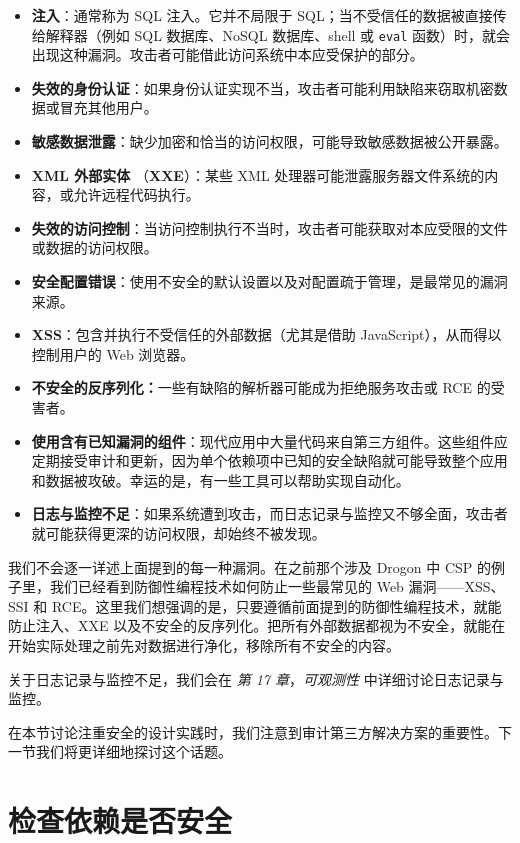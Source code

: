 \begin{itemize}
\label{idx:1045}
\item \textbf{注入}：通常称为 SQL 注入。它并不局限于 SQL；当不受信任的数据被直接传给解释器（例如 SQL 数据库、NoSQL 数据库、shell 或 \texttt{eval} 函数）时，就会出现这种漏洞。攻击者可能借此访问系统中本应受保护的部分。
\item \textbf{失效的身份认证}：如果身份认证实现不当，攻击者可能利用缺陷来窃取机密数据或冒充其他用户。
\item \textbf{敏感数据泄露}：缺少加密和恰当的访问权限，可能导致敏感数据被公开暴露。
\label{idx:1046}
\item \textbf{XML 外部实体 }（\textbf{XXE}）：某些 XML 处理器可能泄露服务器文件系统的内容，或允许远程代码执行。
\item \textbf{失效的访问控制}：当访问控制执行不当时，攻击者可能获取对本应受限的文件或数据的访问权限。
\item \textbf{安全配置错误}：使用不安全的默认设置以及对配置疏于管理，是最常见的漏洞来源。
\item \textbf{XSS}：包含并执行不受信任的外部数据（尤其是借助 JavaScript），从而得以控制用户的 Web 浏览器。
\item \textbf{不安全的反序列化：}一些有缺陷的解析器可能成为拒绝服务攻击或 RCE 的受害者。
\label{idx:1047}
\item \textbf{使用含有已知漏洞的组件}：现代应用中大量代码来自第三方组件。这些组件应定期接受审计和更新，因为单个依赖项中已知的安全缺陷就可能导致整个应用和数据被攻破。幸运的是，有一些工具可以帮助实现自动化。
\item \textbf{日志与监控不足}：如果系统遭到攻击，而日志记录与监控又不够全面，攻击者就可能获得更深的访问权限，却始终不被发现。
\end{itemize}

我们不会逐一详述上面提到的每一种漏洞。在之前那个涉及 Drogon 中 CSP 的例子里，我们已经看到防御性编程技术如何防止一些最常见的 Web 漏洞——XSS、SSI 和 RCE。这里我们想强调的是，只要遵循前面提到的防御性编程技术，就能防止注入、XXE 以及不安全的反序列化。把所有外部数据都视为不安全，就能在开始实际处理之前先对数据进行净化，移除所有不安全的内容。

关于日志记录与监控不足，我们会在 \emph{第 17 章}，\emph{可观测性} 中详细讨论日志记录与监控。

在本节讨论注重安全的设计实践时，我们注意到审计第三方解决方案的重要性。下一节我们将更详细地探讨这个话题。

\section{检查依赖是否安全}

